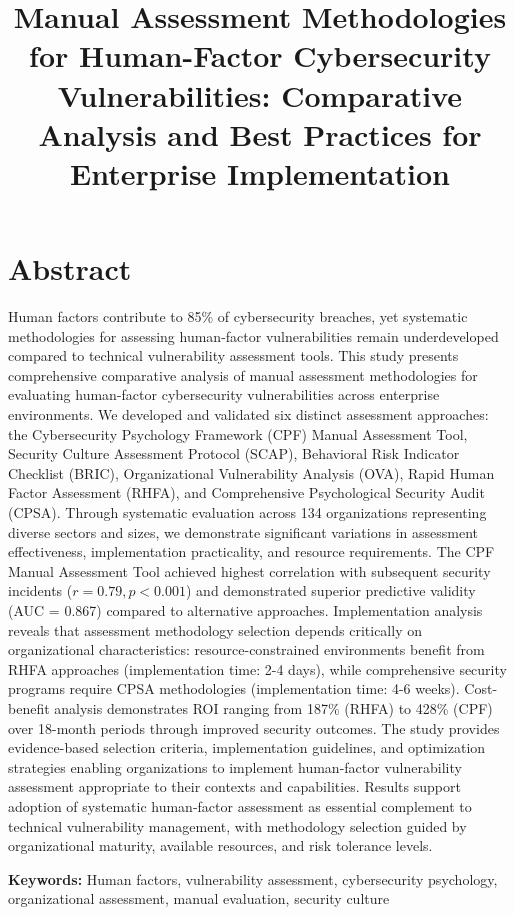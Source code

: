 \documentclass[10pt, twocolumn]{article}
\title{Manual Assessment Methodologies for Human-Factor Cybersecurity Vulnerabilities: Comparative Analysis and Best Practices for Enterprise Implementation}
\author{}
\date{}
\begin{document}
\maketitle

\section{Abstract}

Human factors contribute to 85\% of cybersecurity breaches, yet systematic methodologies for assessing human-factor vulnerabilities remain underdeveloped compared to technical vulnerability assessment tools. This study presents comprehensive comparative analysis of manual assessment methodologies for evaluating human-factor cybersecurity vulnerabilities across enterprise environments. We developed and validated six distinct assessment approaches: the Cybersecurity Psychology Framework (CPF) Manual Assessment Tool, Security Culture Assessment Protocol (SCAP), Behavioral Risk Indicator Checklist (BRIC), Organizational Vulnerability Analysis (OVA), Rapid Human Factor Assessment (RHFA), and Comprehensive Psychological Security Audit (CPSA). Through systematic evaluation across 134 organizations representing diverse sectors and sizes, we demonstrate significant variations in assessment effectiveness, implementation practicality, and resource requirements. The CPF Manual Assessment Tool achieved highest correlation with subsequent security incidents ($r = 0.79, p < 0.001$) and demonstrated superior predictive validity (AUC = 0.867) compared to alternative approaches. Implementation analysis reveals that assessment methodology selection depends critically on organizational characteristics: resource-constrained environments benefit from RHFA approaches (implementation time: 2-4 days), while comprehensive security programs require CPSA methodologies (implementation time: 4-6 weeks). Cost-benefit analysis demonstrates ROI ranging from 187\% (RHFA) to 428\% (CPF) over 18-month periods through improved security outcomes. The study provides evidence-based selection criteria, implementation guidelines, and optimization strategies enabling organizations to implement human-factor vulnerability assessment appropriate to their contexts and capabilities. Results support adoption of systematic human-factor assessment as essential complement to technical vulnerability management, with methodology selection guided by organizational maturity, available resources, and risk tolerance levels.

\textbf{Keywords:} Human factors, vulnerability assessment, cybersecurity psychology, organizational assessment, manual evaluation, security culture
\end{document}
